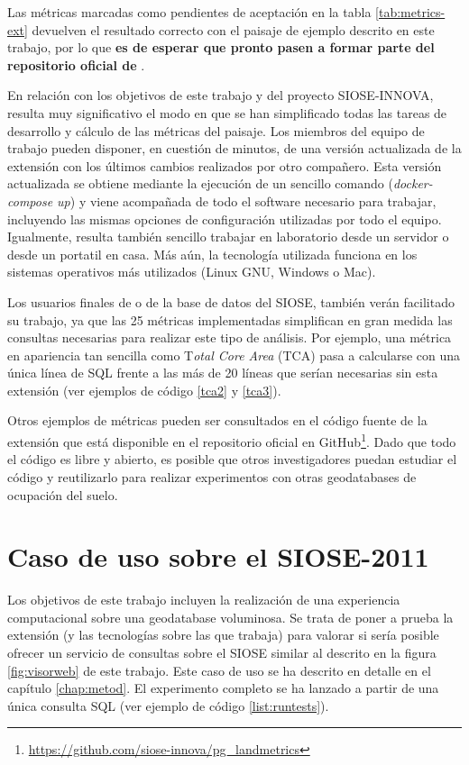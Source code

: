 Las métricas marcadas como pendientes de aceptación en la tabla \ref{tab:metrics-ext} devuelven el resultado correcto con el paisaje de ejemplo descrito en este trabajo, por lo que \textbf{es de esperar que pronto pasen a formar parte del repositorio oficial de \pgland{}}.

En relación con los objetivos de este trabajo y del proyecto SIOSE-INNOVA, resulta muy significativo el modo en que se han simplificado todas las tareas de desarrollo y cálculo de las métricas del paisaje. Los miembros del equipo de trabajo pueden disponer, en cuestión de minutos, de una versión actualizada de la extensión \pgland{} con los últimos cambios realizados por otro compañero. Esta versión actualizada se obtiene mediante la ejecución de un sencillo comando (\textit{docker-compose up}) y viene acompañada de todo el software necesario para trabajar, incluyendo las mismas opciones de configuración utilizadas por todo el equipo. Igualmente, resulta también sencillo trabajar en laboratorio desde un servidor o desde un portatil en casa. Más aún, la tecnología utilizada funciona en los sistemas operativos más utilizados (Linux GNU, Windows o Mac). 

Los usuarios finales de \pgland{} o de la base de datos del SIOSE, también verán facilitado su trabajo, ya que las 25 métricas implementadas simplifican en gran medida las consultas necesarias para realizar este tipo de análisis. Por ejemplo, una métrica en apariencia tan sencilla como T\textit{otal Core Area} (TCA) pasa a calcularse con una única línea de SQL frente a las más de 20 líneas que serían necesarias sin esta extensión (ver ejemplos de código \ref{tca2} y \ref{tca3}).

Otros ejemplos de métricas pueden ser consultados en el código fuente de la extensión \pgland{} que está disponible en el repositorio oficial en GitHub\footnote{\url{https://github.com/siose-innova/pg_landmetrics}}. Dado que todo el código es libre y abierto, es posible que otros investigadores puedan estudiar el código y reutilizarlo para realizar experimentos con otras geodatabases de ocupación del suelo.

\section{Caso de uso sobre el SIOSE-2011 \label{sec:caso_uso}}

Los objetivos de este trabajo incluyen la realización de una experiencia computacional sobre una geodatabase voluminosa. Se trata de poner a prueba la extensión \pgland{} (y las tecnologías sobre las que trabaja) para valorar si sería posible ofrecer un servicio de consultas sobre el SIOSE similar al descrito en la figura \ref{fig:visorweb} de este trabajo. Este caso de uso se ha descrito en detalle en el capítulo \ref{chap:metod}. El experimento completo se ha lanzado a partir de una única consulta SQL (ver ejemplo de código \ref{list:runtests}).

